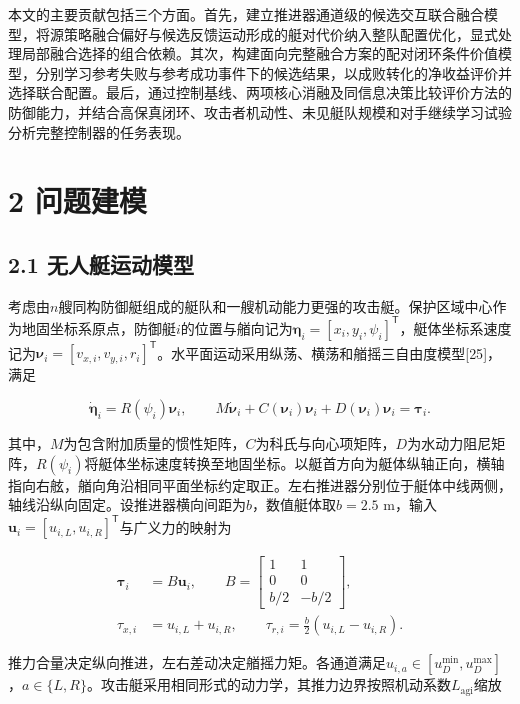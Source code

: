 \documentclass[UTF8,a4paper,zihao=5,fontset=none]{ctexart}
\begin{document}
本文的主要贡献包括三个方面。首先，建立推进器通道级的候选交互联合融合模型，将源策略融合偏好与候选反馈运动形成的艇对代价纳入整队配置优化，显式处理局部融合选择的组合依赖。其次，构建面向完整融合方案的配对闭环条件价值模型，分别学习参考失败与参考成功事件下的候选结果，以成败转化的净收益评价并选择联合配置。最后，通过控制基线、两项核心消融及同信息决策比较评价方法的防御能力，并结合高保真闭环、攻击者机动性、未见艇队规模和对手继续学习试验分析完整控制器的任务表现。

\section*{2 问题建模}

\subsection*{2.1
无人艇运动模型}

考虑由\(n\)艘同构防御艇组成的艇队和一艘机动能力更强的攻击艇。保护区域中心作为地固坐标系原点，防御艇\(i\)的位置与艏向记为\(\boldsymbol\eta_i=[x_i,y_i,\psi_i]^{\mathsf T}\)，艇体坐标系速度记为\(\boldsymbol\nu_i=[v_{x,i},v_{y,i},r_i]^{\mathsf T}\)。水平面运动采用纵荡、横荡和艏摇三自由度模型{[}25{]}，满足

\[
\dot{\boldsymbol\eta}_i=R(\psi_i)\boldsymbol\nu_i,
\qquad
M\dot{\boldsymbol\nu}_i+C(\boldsymbol\nu_i)\boldsymbol\nu_i+D(\boldsymbol\nu_i)\boldsymbol\nu_i=\boldsymbol\tau_i.
\tag{1}
\]

其中，\(M\)为包含附加质量的惯性矩阵，\(C\)为科氏与向心项矩阵，\(D\)为水动力阻尼矩阵，\(R(\psi_i)\)将艇体坐标速度转换至地固坐标。以艇首方向为艇体纵轴正向，横轴指向右舷，艏向角沿相同平面坐标约定取正。左右推进器分别位于艇体中线两侧，轴线沿纵向固定。设推进器横向间距为\(b\)，数值艇体取\(b=2.5\)
m，输入\(\boldsymbol u_i=[u_{i,L},u_{i,R}]^{\mathsf T}\)与广义力的映射为

\[
\begin{aligned}
\boldsymbol\tau_i&=B\boldsymbol u_i,\qquad
B=\begin{bmatrix}1&1\\0&0\\b/2&-b/2\end{bmatrix},\\
\tau_{x,i}&=u_{i,L}+u_{i,R},\qquad
\tau_{r,i}=\frac b2(u_{i,L}-u_{i,R}).
\end{aligned}
\tag{2}
\]

推力合量决定纵向推进，左右差动决定艏摇力矩。各通道满足\(u_{i,a}\in[u_D^{\min},u_D^{\max}]\)，\(a\in\{L,R\}\)。攻击艇采用相同形式的动力学，其推力边界按照机动系数\(L_{\mathrm{agi}}\)缩放
\end{document}
